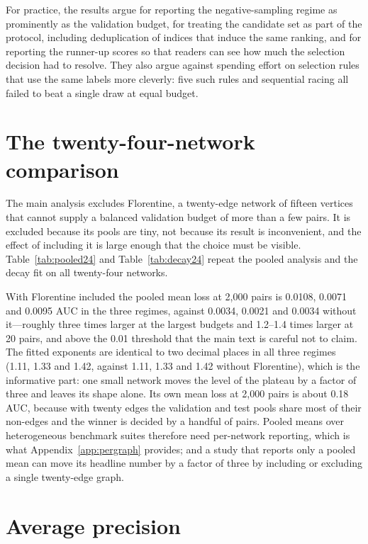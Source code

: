 \documentclass{comjnl}
\begin{document}
For practice, the results argue for reporting the negative-sampling regime as prominently as the validation budget, for treating the candidate set as part of the protocol, including deduplication of indices that induce the same ranking, and for reporting the runner-up scores so that readers can see how much the selection decision had to resolve. They also argue against spending effort on selection rules that use the same labels more cleverly: five such rules and sequential racing all failed to beat a single draw at equal budget.

\appendix

\section{The twenty-four-network comparison}
\label{app:all24}

The main analysis excludes Florentine, a twenty-edge network of fifteen vertices that cannot supply a
balanced validation budget of more than a few pairs. It is excluded because its pools are tiny, not
because its result is inconvenient, and the effect of including it is large enough that the choice
must be visible. Table~\ref{tab:pooled24} and Table~\ref{tab:decay24} repeat the pooled analysis and
the decay fit on all twenty-four networks.



With Florentine included the pooled mean loss at 2{,}000 pairs is 0.0108, 0.0071 and 0.0095 AUC in
the three regimes, against 0.0034, 0.0021 and 0.0034 without it---roughly three times larger at the largest budgets and 1.2--1.4 times larger at 20 pairs, and above the 0.01 threshold that the main text is careful not to claim. The fitted exponents are identical to two decimal places in all three regimes (1.11, 1.33 and 1.42, against 1.11, 1.33 and 1.42 without Florentine), which is the informative part: one small network moves the level of the plateau by a factor of three and leaves its shape alone. Its own mean loss at
2{,}000 pairs is about 0.18 AUC, because with twenty edges the validation and test pools share most
of their non-edges and the winner is decided by a handful of pairs. Pooled means over heterogeneous
benchmark suites therefore need per-network reporting, which is what Appendix~\ref{app:pergraph}
provides; and a study that reports only a pooled mean can move its headline number by a factor of
three by including or excluding a single twenty-edge graph.

\section{Average precision}
\label{app:ap}
\end{document}
